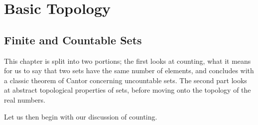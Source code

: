 \section{Basic Topology}
\subsection{Finite and Countable Sets}
This chapter is split into two portions; the first looks at counting, what it means for us to say that two sets have the same number of elements, and concludes with a classic theorem of Cantor concerning uncountable sets. The second part looks at abstract topological properties of sets, before moving onto the topology of the real numbers. 

Let us then begin with our discussion of counting. 